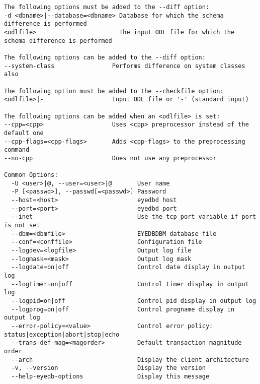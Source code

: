 \begin{verbatim}
The following options must be added to the --diff option:
-d <dbname>|--database=<dbname> Database for which the schema difference is performed
<odlfile>                       The input ODL file for which the schema difference is performed

The following options can be added to the --diff option:
--system-class                Performs difference on system classes also

The following option must be added to the --checkfile option:
<odlfile>|-                   Input ODL file or '-' (standard input)

The following options can be added when an <odlfile> is set:
--cpp=<cpp>                   Uses <cpp> preprocessor instead of the default one
--cpp-flags=<cpp-flags>       Adds <cpp-flags> to the preprocessing command
--no-cpp                      Does not use any preprocessor

Common Options:
  -U <user>|@, --user=<user>|@       User name
  -P [<passwd>], --passwd[=<passwd>] Password
  --host=<host>                      eyedbd host
  --port=<port>                      eyedbd port
  --inet                             Use the tcp_port variable if port is not set
  --dbm=<dbmfile>                    EYEDBDBM database file
  --conf=<conffile>                  Configuration file
  --logdev=<logfile>                 Output log file
  --logmask=<mask>                   Output log mask
  --logdate=on|off                   Control date display in output log
  --logtimer=on|off                  Control timer display in output log
  --logpid=on|off                    Control pid display in output log
  --logprog=on|off                   Control progname display in output log
  --error-policy=<value>             Control error policy: status|exception|abort|stop|echo
  --trans-def-mag=<magorder>         Default transaction magnitude order
  --arch                             Display the client architecture
  -v, --version                      Display the version
  --help-eyedb-options               Display this message
\end{verbatim}






